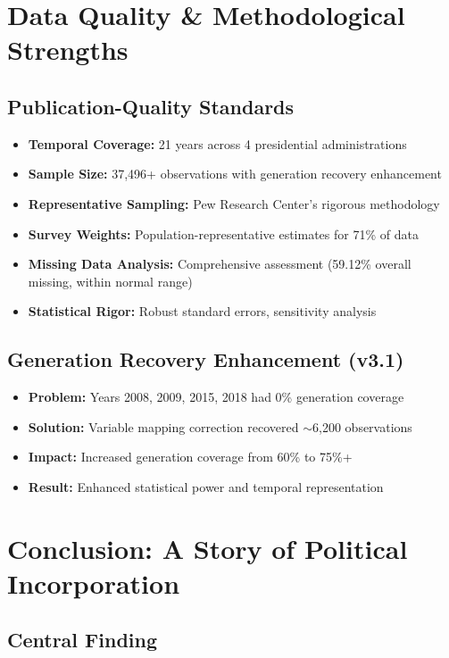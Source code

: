 \documentclass[11pt,letterpaper]{article}
\begin{document}
\section{Data Quality \& Methodological Strengths}

\subsection{Publication-Quality Standards}
\begin{itemize}
    \item \textbf{Temporal Coverage:} 21 years across 4 presidential administrations
    \item \textbf{Sample Size:} 37,496+ observations with generation recovery enhancement
    \item \textbf{Representative Sampling:} Pew Research Center's rigorous methodology
    \item \textbf{Survey Weights:} Population-representative estimates for 71\% of data
    \item \textbf{Missing Data Analysis:} Comprehensive assessment (59.12\% overall missing, within normal range)
    \item \textbf{Statistical Rigor:} Robust standard errors, sensitivity analysis
\end{itemize}

\subsection{Generation Recovery Enhancement (v3.1)}
\begin{itemize}
    \item \textbf{Problem:} Years 2008, 2009, 2015, 2018 had 0\% generation coverage
    \item \textbf{Solution:} Variable mapping correction recovered $\sim$6,200 observations
    \item \textbf{Impact:} Increased generation coverage from 60\% to 75\%+
    \item \textbf{Result:} Enhanced statistical power and temporal representation
\end{itemize}

\section{Conclusion: A Story of Political Incorporation}

\subsection{Central Finding}
\end{document}
